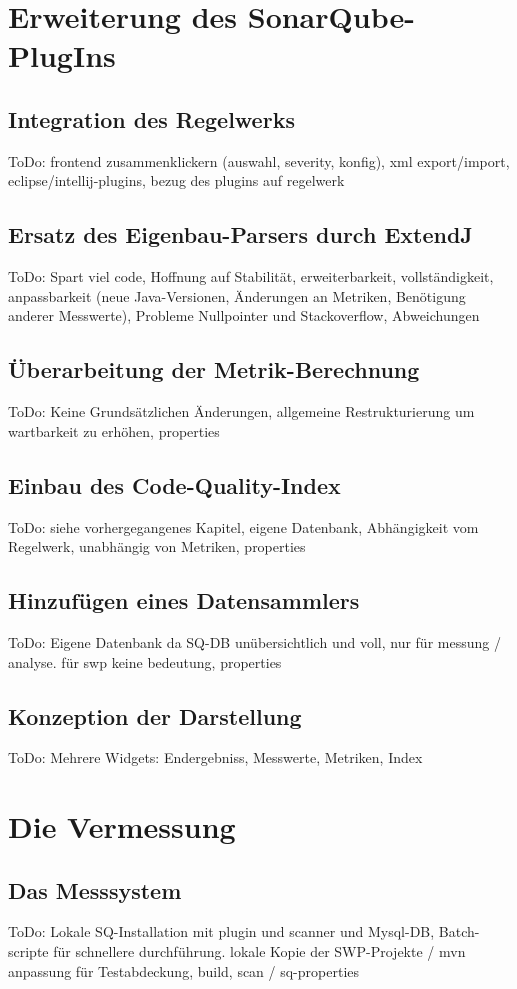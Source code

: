 \documentclass[da,ngerman]{stthesis}
\begin{document}
	\chapter{Erweiterung des SonarQube-PlugIns}
		\section{Integration des Regelwerks}
			ToDo: frontend zusammenklickern (auswahl, severity, konfig), xml export/import, eclipse/intellij-plugins, bezug des plugins auf regelwerk
		\section{Ersatz des Eigenbau-Parsers durch ExtendJ}
			ToDo: Spart viel code, Hoffnung auf Stabilität, erweiterbarkeit, vollständigkeit, anpassbarkeit (neue Java-Versionen, Änderungen an Metriken, Benötigung anderer Messwerte), Probleme Nullpointer und Stackoverflow, Abweichungen
		\section{Überarbeitung der Metrik-Berechnung}
			ToDo: Keine Grundsätzlichen Änderungen, allgemeine Restrukturierung um wartbarkeit zu erhöhen, properties
		\section{Einbau des Code-Quality-Index}
			ToDo: siehe vorhergegangenes Kapitel, eigene Datenbank, Abhängigkeit vom Regelwerk, unabhängig von Metriken, properties
		\section{Hinzufügen eines Datensammlers}
  			ToDo: Eigene Datenbank da SQ-DB unübersichtlich und voll, nur für messung / analyse. für swp keine bedeutung, properties
  		\section{Konzeption der Darstellung}
  			ToDo: Mehrere Widgets: Endergebniss, Messwerte, Metriken, Index
  		
  	\chapter{Die Vermessung}
  		\section{Das Messsystem}
  			ToDo: Lokale SQ-Installation mit plugin und scanner und Mysql-DB, Batch-scripte für schnellere durchführung. lokale Kopie der SWP-Projekte / mvn anpassung für Testabdeckung, build, scan / sq-properties
\end{document}
